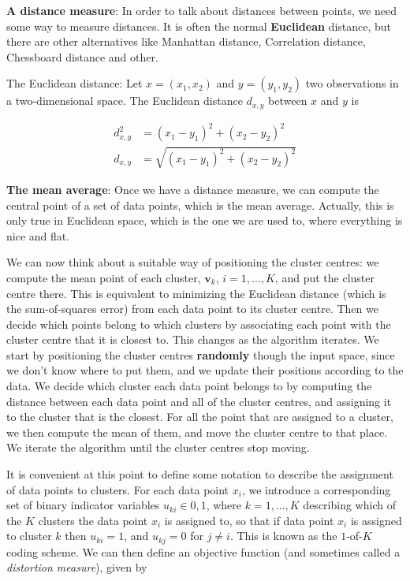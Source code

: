 \documentclass[]{book}
\theoremstyle{definition}
\theoremstyle{definition}
\theoremstyle{definition}
\theoremstyle{remark}
\begin{document}
\textbf{A distance measure}: In order to talk about distances between
points, we need some way to measure distances. It is often the normal
\textbf{Euclidean} distance, but there are other alternatives like
Manhattan distance, Correlation distance, Chessboard distance and other.

The Euclidean distance: Let \(x=(x_1,x_2)\) and \(y=(y_1,y_2)\) two
observations in a two-dimensional space. The Euclidean distance
\(d_{x,y}\) between \(x\) and \(y\) is

\begin{align*}  
d_{x,y}^2 &= (x_1-y_1)^2+(x_2 - y_2)^2  \\
d_{x,y} &= \sqrt{(x_1-y_1)^2+(x_2 - y_2)^2}
\end{align*}

\textbf{The mean average}: Once we have a distance measure, we can
compute the central point of a set of data points, which is the mean
average. Actually, this is only true in Euclidean space, which is the
one we are used to, where everything is nice and flat.

We can now think about a suitable way of positioning the cluster
centres: we compute the mean point of each cluster, \(\textbf{v}_k\),
\(i=1,\ldots,K\), and put the cluster centre there. This is equivalent
to minimizing the Euclidean distance (which is the sum-of-squares error)
from each data point to its cluster centre. Then we decide which points
belong to which clusters by associating each point with the cluster
centre that it is closest to. This changes as the algorithm iterates. We
start by positioning the cluster centres \textbf{randomly} though the
input space, since we don't know where to put them, and we update their
positions according to the data. We decide which cluster each data point
belongs to by computing the distance between each data point and all of
the cluster centres, and assigning it to the cluster that is the
closest. For all the point that are assigned to a cluster, we then
compute the mean of them, and move the cluster centre to that place. We
iterate the algorithm until the cluster centres stop moving.

It is convenient at this point to define some notation to describe the
assignment of data points to clusters. For each data point \(x_i\), we
introduce a corresponding set of binary indicator variables
\(u_{ki} \in {0,1}\), where \(k=1,\ldots,K\) describing which of the
\(K\) clusters the data point \(x_i\) is assigned to, so that if data
point \(x_i\) is assigned to cluster \(k\) then \(u_{ki}= 1\), and
\(u_{kj}= 0\) for \(j \neq i\). This is known as the \(1\)-of-\(K\)
coding scheme. We can then define an objective function (and sometimes
called a \emph{distortion measure}), given by
\end{document}
